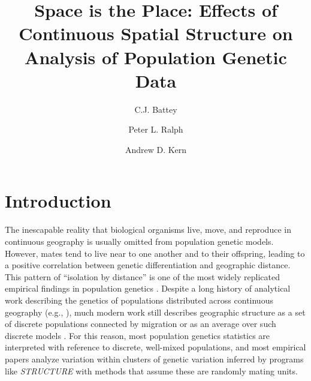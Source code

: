 \documentclass[10pt,twoside,lineno,hidelinks]{preprint}
\title{Space is the Place: Effects of Continuous Spatial Structure on Analysis of Population Genetic Data}
\author[$\ast$,1]{C.J. Battey}
\author[$\ast, \dagger$]{Peter L. Ralph}
\author[$\ast, \dagger$]{Andrew D. Kern}
\affil[$\ast$]{University of Oregon Dept. Biology, Institute for Ecology Evolution}
\begin{document}
\maketitle
\thispagestyle{firststyle}
\firstpagefootnote


\vspace{-35pt}%

\section{Introduction}

The inescapable reality that biological organisms live, move, and reproduce in continuous geography is usually omitted from population genetic models. However, mates tend to live near to one another and to their offspring, leading to a positive correlation between genetic differentiation and geographic distance. This pattern of ``isolation by distance'' \citep{Wright1943} is one of the most widely replicated empirical findings in population genetics \citep{Chen2017,Jay2012,Sharbel2000}.
Despite a long history of analytical work describing the genetics of populations distributed across continuous geography
(e.g., \citet{Wright1943,Rousset1997,barton2002neutral,Barton2010,Ringbauer2017,robledoarnuncio2010isolation,Wilkins2002linearcoalescent,Wilkins2004separation}), 
much modern work still describes geographic structure as a set of discrete populations connected by migration \citep[e.g.,][]{Wright1931,epperson2003geographical,rousset2011likelihoodbased,Shirk2014,lundgren2019populations} or as an average over such discrete models \citep{Petkova2015,al2019estimating}. 
For this reason, most population genetics statistics are interpreted with reference to discrete, well-mixed populations, and most empirical papers analyze variation within clusters of genetic variation inferred by programs like \textit{STRUCTURE} \citep{Pritchard2000} with methods that assume these are randomly mating units.
\end{document}
